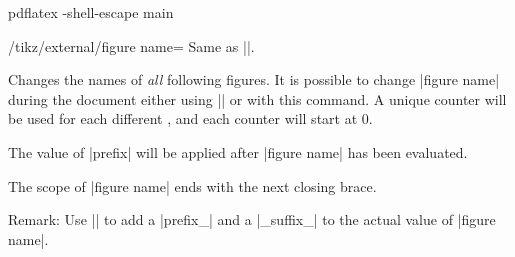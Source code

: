 {\begin{command}{}
\begin{codeexample}
\end{codeexample}
\begin{codeexample}
pdflatex -shell-escape main
\end{codeexample}
\end{command}

\begin{key}{/tikz/external/figure name=}
	Same as ||.
\end{key}
\begin{command}{}
	Changes the names of \emph{all} following figures. It is possible to change |figure name| during the document either using || or with this command. A unique counter will be used for each different , and each counter will start at $0$.

	The value of |prefix| will be applied after |figure name| has been evaluated.
	The scope of |figure name| ends with the next closing brace.

	Remark: Use || to add a |prefix_| and a |_suffix_| to the actual value of |figure name|.
\end{command}

}
